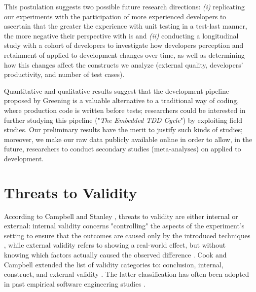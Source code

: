 This postulation suggests two possible future research directions: \textit{(i)} replicating our experiments with the participation of more experienced developers to ascertain that the greater the experience with unit testing in a test-last manner, the more negative their perspective with \tdd is and \textit{(ii)} conducting a longitudinal study with a cohort of developers to investigate how developers perception and retainment of \tdd applied to \es development changes over time, as well as determining how this changes affect the constructs we analyze (\ie external quality, developers' productivity, and number of test cases).

Quantitative and qualitative results suggest that the development pipeline proposed by Greening\cite{TDDEC} is a valuable alternative to a traditional way of coding, where production code is written before tests; researchers could be interested in further studying this pipeline (\ie "\textit{The Embedded TDD Cycle}") by exploiting field studies. 
Our preliminary results have the merit to justify such kinds of studies; moreover, we make our raw data publicly available online in order to allow, in the future, researchers to conduct secondary studies (\eg meta-analyses) on \tdd applied to \ess development.

\section{Threats to Validity}
According to Campbell and Stanley \cite{ResearchOfTeaching}, threats to validity are either internal or external: internal validity concerns "controlling" the aspects of the experiment's setting to ensure that the outcomes are caused only by the introduced techniques \cite{DBLP:conf/icse/SiegmundSA15}, while external validity refers to showing a real-world effect, but without knowing which factors actually caused the observed difference \cite{DBLP:conf/icse/SiegmundSA15}.
Cook and Campbell extended the list of validity categories to: conclusion, internal, construct, and external validity \cite{QuasiExp}. The latter classification has often been adopted in past empirical software engineering studies \cite{DBLP:books/sp/WohlinRHOR00}. 


